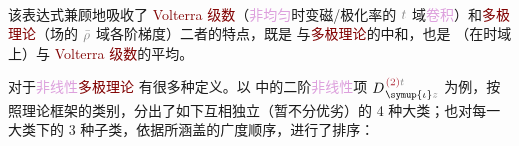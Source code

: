 \begin{subequations}
\begin{align}
\end{align}
\end{subequations}
该表达式兼顾地吸收了 \textcolor{Maroon}{Volterra 级数}（\textcolor{Plum}{非均匀}时变磁/极化率的 $\mathcolor{gray}{t}$ 域\textcolor{Plum}{卷积}）和\textcolor{Maroon}{多极理论}（场的 $\mathcolor{gray}{\bar{\rho}}$ 域各阶梯度）二者的特点，既是  与\textcolor{Maroon}{多极理论}的中和，也是 （在时域上）与 \textcolor{Maroon}{Volterra 级数}的平均。

对于\textcolor{Plum}{非线性}\textcolor{Maroon}{多极理论}  有很多种定义。以  中的二阶\textcolor{Plum}{非线性}项 $D^{\;\! \textcolor{Maroon}{(2)} \mathcolor{gray}{t}}_{\;\! \symup{\iota}\mathcolor{gray}{z}}$ 为例，按照\textcolor{NavyBlue}{理论框架}的类别，分出了如下互相独立（暂不分优劣）的 4 种大类；也对每一大类下的 3 种子类，依据所涵盖的广度顺序，进行了排序：
